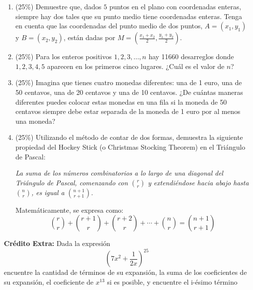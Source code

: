 \vspace{0.2cm}
\begin{enumerate}
    \item (25\%) Demuestre que, dados $5$ puntos en el plano con coordenadas enteras, siempre hay dos tales que su punto medio tiene coordenadas enteras. Tenga en cuenta que las coordenadas del punto medio de dos puntos, $A=(x_1,y_1)$ y $B=(x_2,y_2)$, están dadas por $\displaystyle M=\left(\frac{x_1 + x_2}{2}, \frac{y_1 + y_2}{2}\right)$.
    \item (25\%) Para los enteros positivos  $1,2,3,\dots ,n$ hay 11660 desarreglos donde $1,2,3,4,5$ aparecen en los primeros cinco lugares. ¿Cuál es el valor de $n$?
    \item (25\%) Imagina que tienes cuatro monedas diferentes: una de 1 euro, una de 50 centavos, una de 20 centavos y una de 10 centavos. ¿De cuántas maneras diferentes puedes colocar estas monedas en una fila si la moneda de 50 centavos siempre debe estar separada de la moneda de 1 euro por al menos una moneda?
    \item (25\%) Utilizando el método de contar de dos formas, demuestra la siguiente propiedad del Hockey Stick (o Christmas Stocking Theorem) en el Triángulo de Pascal: 

\textit{La suma de los números combinatorios a lo largo de una diagonal del Triángulo de Pascal, comenzando con \( \displaystyle\binom{r}{r} \) y extendiéndose hacia abajo hasta \( \displaystyle\binom{n}{r} \), es igual a \( \displaystyle \binom{n+1}{r+1} \).}

Matemáticamente, se expresa como:
\[ \binom{r}{r} + \binom{r+1}{r} + \binom{r+2}{r} + \cdots + \binom{n}{r} = \binom{n+1}{r+1} \]
\end{enumerate}

\textbf{Crédito Extra:} Dada la expresión \[\left(7x^2+\frac{1}{2x}\right)^{25}\]encuentre la cantidad de términos de su expansión, la suma de los coeficientes de su expansión, el coeficiente de $x^{13}$ si es posible, y encuentre el i-ésimo término